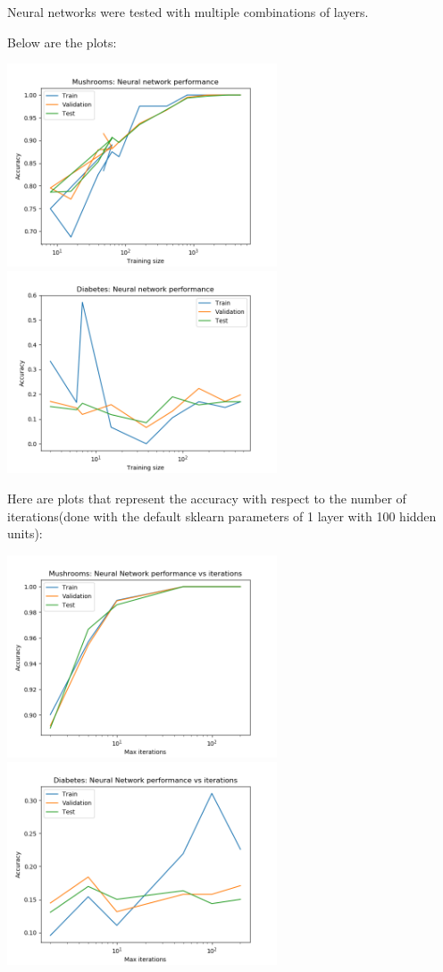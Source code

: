 \documentclass[11pt]{article}
\begin{document}
        Neural networks were tested with multiple combinations of layers.

        Below are the plots:

        \includegraphics[width=8cm]{mushrooms/mushroom_nn_trainingsize.png}
        \includegraphics[width=8cm]{diabetes/diabetes_nn_trainingsize.png}

        Here are plots that represent the accuracy with respect to the number of iterations(done with the default sklearn parameters of 1 layer with 100 hidden units):

        \includegraphics[width=8cm]{mushrooms/mushroom_nn_iterations.png}
        \includegraphics[width=8cm]{diabetes/diabetes_nn_iterations.png}
\end{document}
